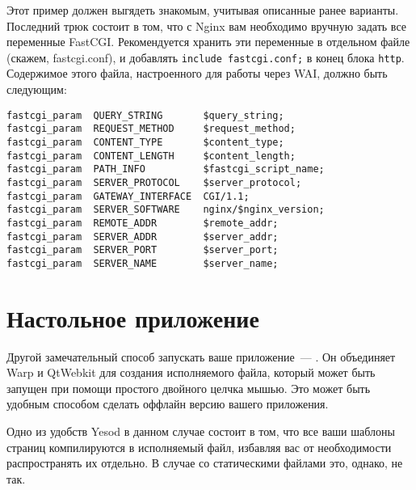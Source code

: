 Этот пример должен выгядеть знакомым, учитывая описанные ранее варианты. Последний трюк состоит в том, что с Nginx вам необходимо вручную задать все переменные FastCGI. Рекомендуется хранить эти переменные в отдельном файле (скажем, fastcgi.conf), и добавлять \lstinline{include fastcgi.conf;} в конец блока \lstinline{http}. Содержимое этого файла, настроенного для работы через WAI, должно быть следующим:

\begin{lstlisting}
fastcgi_param  QUERY_STRING       $query_string;
fastcgi_param  REQUEST_METHOD     $request_method;
fastcgi_param  CONTENT_TYPE       $content_type;
fastcgi_param  CONTENT_LENGTH     $content_length;
fastcgi_param  PATH_INFO          $fastcgi_script_name;
fastcgi_param  SERVER_PROTOCOL    $server_protocol;
fastcgi_param  GATEWAY_INTERFACE  CGI/1.1;
fastcgi_param  SERVER_SOFTWARE    nginx/$nginx_version;
fastcgi_param  REMOTE_ADDR        $remote_addr;
fastcgi_param  SERVER_ADDR        $server_addr;
fastcgi_param  SERVER_PORT        $server_port;
fastcgi_param  SERVER_NAME        $server_name;
\end{lstlisting}%

\section{Настольное приложение}
%

Другой замечательный способ запускать ваше приложение~--- . Он объединяет Warp и QtWebkit для создания исполняемого файла, который может быть запущен при помощи простого двойного целчка мышью. Это может быть удобным способом сделать оффлайн версию вашего приложения.
%

Одно из удобств Yesod в данном случае состоит в том, что все ваши шаблоны страниц компилируются в исполняемый файл, избавляя вас от необходимости распространять их отдельно. В случае со статическими файлами это, однако, не так.
%

